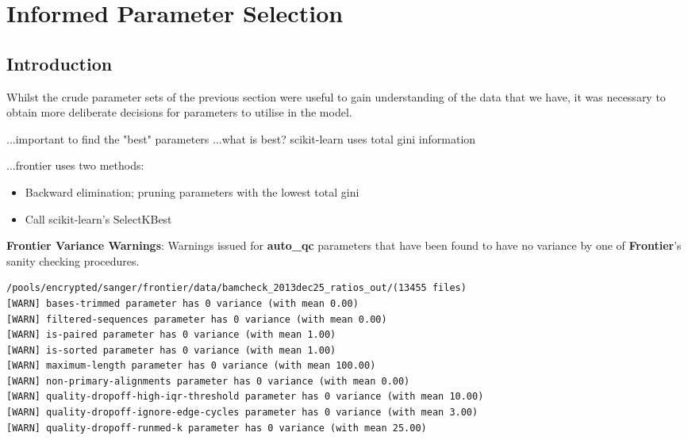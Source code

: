 \section{Informed Parameter Selection}
\subsection{Introduction}

Whilst the crude parameter sets of the previous section were useful to gain
understanding of the data that we have, it was necessary to obtain more
deliberate decisions for parameters to utilise in the model.

...important to find the "best" parameters
...what is best? scikit-learn uses total gini information

...frontier uses two methods:
\begin{itemize}
    \item Backward elimination; pruning parameters with the lowest total gini
    \item Call scikit-learn's SelectKBest
\end{itemize}

\begin{listing}[H]
    \caption[frontier-warnings]{\textbf{Frontier Variance Warnings}:
        Warnings issued for \textbf{auto\_qc} parameters that have been found to
        have no variance by one of \textbf{Frontier}'s sanity checking procedures.}
    \label{list:frontier-warnings}
    \begin{verbatim}
/pools/encrypted/sanger/frontier/data/bamcheck_2013dec25_ratios_out/(13455 files)
[WARN] bases-trimmed parameter has 0 variance (with mean 0.00)
[WARN] filtered-sequences parameter has 0 variance (with mean 0.00)
[WARN] is-paired parameter has 0 variance (with mean 1.00)
[WARN] is-sorted parameter has 0 variance (with mean 1.00)
[WARN] maximum-length parameter has 0 variance (with mean 100.00)
[WARN] non-primary-alignments parameter has 0 variance (with mean 0.00)
[WARN] quality-dropoff-high-iqr-threshold parameter has 0 variance (with mean 10.00)
[WARN] quality-dropoff-ignore-edge-cycles parameter has 0 variance (with mean 3.00)
[WARN] quality-dropoff-runmed-k parameter has 0 variance (with mean 25.00)
    \end{verbatim}
\end{listing}

